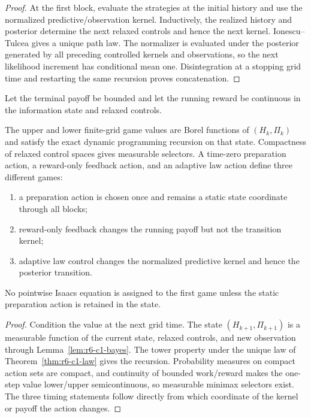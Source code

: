 \begin{proof}
At the first block, evaluate the strategies at the initial history and use the
normalized predictive/observation kernel.  Inductively, the realized history
and posterior determine the next relaxed controls and hence the next kernel.
Ionescu--Tulcea gives a unique path law.  The normalizer is evaluated under the
posterior generated by all preceding controlled kernels and observations, so
the next likelihood increment has conditional mean one.  Disintegration at a
stopping grid time and restarting the same recursion proves concatenation.
\end{proof}

Let the terminal payoff be bounded and let the running reward be continuous in
the information state and relaxed controls.

\begin{theorem}
\label{thm:r6-c1-dpp}
The upper and lower finite-grid game values are Borel functions of
\((H_k,\Pi_k)\) and satisfy the exact dynamic programming recursion on that
state.  Compactness of relaxed control spaces gives measurable selectors.  A
time-zero preparation action, a reward-only feedback action, and an adaptive
law action define three different games:
\begin{enumerate}[label=(\roman*)]
\item a preparation action is chosen once and remains a static state
coordinate through all blocks;
\item reward-only feedback changes the running payoff but not the transition
kernel;
\item adaptive law control changes the normalized predictive kernel and hence
the posterior transition.
\end{enumerate}
No pointwise Isaacs equation is assigned to the first game unless the static
preparation action is retained in the state.
\end{theorem}

\begin{proof}
Condition the value at the next grid time.  The state
\((H_{k+1},\Pi_{k+1})\) is a measurable function of the current state, relaxed
controls, and new observation through
Lemma~\ref{lem:r6-c1-bayes}.  The tower property under the unique law of
Theorem~\ref{thm:r6-c1-law} gives the recursion.  Probability measures on
compact action sets are compact, and continuity of bounded work/reward makes
the one-step value lower/upper semicontinuous, so measurable minimax selectors
exist.  The three timing statements follow directly from which coordinate of
the kernel or payoff the action changes.
\end{proof}

